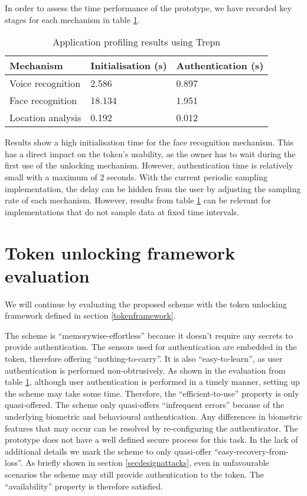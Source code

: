 In order to assess the time performance of the prototype, we have recorded key stages for each mechanism in table \ref{tab:timeprofile}.
\begin{table}
    \begin{tabular}{l|l|l}
		Mechanism         & Initialisation (s) 	& Authentication (s) \\ \hline
		Voice recognition & 2.586	            & 0.897          \\
		Face recognition  & 18.134        		& 1.951          \\
		Location analysis & 0.192          		& 0.012          \\
    \end{tabular}
	\caption{Application profiling results using Trepn}
	\label{tab:timeprofile}
\end{table}

Results show a high initialisation time for the face recognition mechanism. This has a direct impact on the token's usability, as the owner has to wait during the first use of the unlocking mechanism. However, authentication time is relatively small with a maximum of 2 seconds. With the current periodic sampling implementation, the delay can be hidden from the user by adjusting the sampling rate of each mechanism. However, results from table \ref{tab:timeprofile} can be relevant for implementations that do not sample data at fixed time intervals.

\section{Token unlocking framework evaluation}
We will continue by evaluating the proposed scheme with the token unlocking framework defined in section \ref{tokenframework}.

The scheme is ``memorywise-effortless'' because it doesn't require any secrets to provide authentication. The sensors used for authentication are embedded in the token, therefore offering ``nothing-to-carry''. It is also ``easy-to-learn'', as user authentication is performed non-obtrusively. As shown in the evaluation from table \ref{tab:timeprofile}, although user authentication is performed in a timely manner, setting up the scheme may take some time. Therefore, the ``efficient-to-use'' property is only quasi-offered.  The scheme only quasi-offers ``infrequent errors'' because of the underlying biometric and behavioural authentication. Any differences in biometric features that may occur can be resolved by re-configuring the authenticator. The prototype does not have a well defined secure process for this task. In the lack of additional details we mark the scheme to only quasi-offer ``easy-recovery-from-loss''. As briefly shown in section \ref{secdesignattacks}, even in unfavourable scenarios the scheme may still provide authentication to the token. The ``availability'' property is therefore satisfied.

